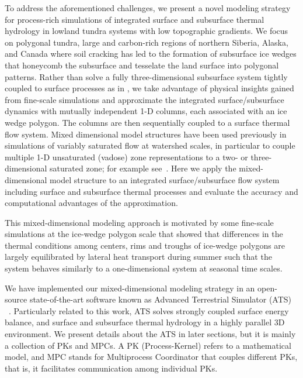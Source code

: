 \documentclass[review]{elsarticle}
\begin{document}
To address the aforementioned challenges, we present a novel modeling strategy for process-rich simulations of integrated surface and subsurface thermal hydrology in lowland tundra systems with low topographic gradients. We focus on polygonal tundra, large and carbon-rich regions of northern Siberia, Alaska, and Canada where soil cracking has led to the formation of subsurface ice wedges that honeycomb the subsurface and tesselate the land surface into polygonal patterns. Rather than solve a fully three-dimensional subsurface system tightly coupled to surface processes as in \cite{spainter2106integrated}, we take advantage of physical insights gained from fine-scale simulations and approximate the integrated surface/subsurface dynamics with mutually independent 1-D columns, each associated with an ice wedge polygon. The columns are then sequentially coupled to a surface thermal flow system. Mixed dimensional model structures have been used previously in simulations of variably saturated flow at watershed scales, in particular to couple multiple 1-D unsaturated (vadose) zone representations to a two- or three-dimensional saturated zone; for example see~\cite{pikul1974numerical,zhu2011method}. Here we apply the mixed-dimensional model structure to an integrated surface/subsurface flow system including surface and subsurface thermal processes and evaluate the accuracy and computational advantages of the approximation. 

This mixed-dimensional modeling approach is motivated by some fine-scale simulations at the ice-wedge polygon scale that showed that differences in the thermal conditions among centers, rims and troughs of ice-wedge polygons are largely equilibrated by lateral heat transport during summer such that the system behaves similarly to a one-dimensional system at seasonal time scales. 

We have implemented our mixed-dimensional modeling strategy in an open-source state-of-the-art software known as Advanced Terrestrial Simulator (ATS) 
~\cite{ecoon2016managing, spainter2016integrated}. Particularly related to this work, ATS solves strongly coupled surface energy balance, and surface and subsurface thermal hydrology in a highly parallel 3D environment. We present details about the ATS in later sections, but it is mainly a collection of PKs and MPCs. A PK (Process-Kernel) refers to a mathematical model, and MPC stands for Multiprocess Coordinator that couples different PKs, that is, it facilitates communication among individual PKs.
\end{document}

